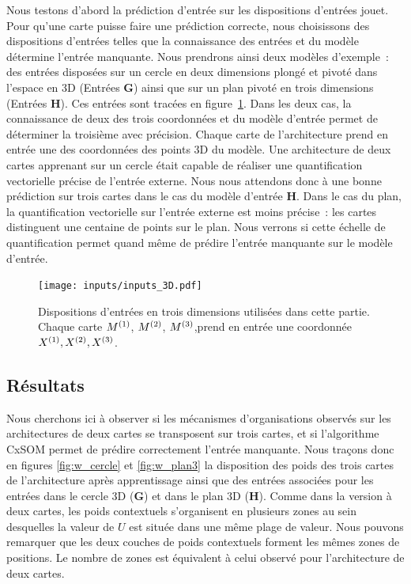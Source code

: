 \documentclass[../main]{subfiles}
\begin{document}
Nous testons d'abord la prédiction d'entrée sur les dispositions d'entrées jouet.
Pour qu'une carte puisse faire une prédiction correcte, nous choisissons des dispositions d'entrées telles que la connaissance des entrées et du modèle détermine l'entrée manquante.
Nous prendrons ainsi deux modèles d'exemple~: des entrées disposées sur un cercle en deux dimensions plongé et pivoté dans l'espace en 3D (Entrées \textbf{G}) ainsi que sur un plan pivoté en trois dimensions (Entrées \textbf{H}). Ces entrées sont tracées en figure~\ref{fig:inputs_3D}. 
Dans les deux cas, la connaissance de deux des trois coordonnées et du modèle d'entrée permet de déterminer la troisième avec précision. Chaque carte de l'architecture prend en entrée une des coordonnées des points 3D du modèle.
Une architecture de deux cartes apprenant sur un cercle était capable de réaliser une quantification vectorielle précise de l'entrée externe. Nous nous attendons donc à une bonne prédiction sur trois cartes dans le cas du modèle d'entrée \textbf{H}. 
Dans le cas du plan, la quantification vectorielle sur l'entrée externe est moins précise~: les cartes distinguent une centaine de points sur le plan. Nous verrons si cette échelle de quantification permet quand même de prédire l'entrée manquante sur le modèle d'entrée.


\begin{figure}[h!]
	\texttt{[image: inputs/inputs\_3D.pdf]}
	\caption{Dispositions d'entrées en trois dimensions utilisées dans cette partie. Chaque carte $M^{({1})}$, $M^{({2})}$, $M^{({3})}$,prend en entrée une coordonnée $X^{({1})}, X^{({2})}, X^{({3})}$. \label{fig:inputs_3D}}
\end{figure}

\subsection{Résultats}

Nous cherchons ici à observer si les mécanismes d'organisations observés sur les architectures de deux cartes se transposent sur trois cartes, et si l'algorithme CxSOM permet de prédire correctement l'entrée manquante.
Nous traçons donc en figures \ref{fig:w_cercle} et \ref{fig:w_plan3} la disposition des poids des trois cartes de l'architecture après apprentissage ainsi que des entrées associées pour les entrées dans le cercle 3D (\textbf{G}) et dans le plan 3D (\textbf{H}).
Comme dans la version à deux cartes, les poids contextuels s'organisent en plusieurs zones au sein desquelles la valeur de $U$ est située dans une même plage de valeur.
Nous pouvons remarquer que les deux couches de poids contextuels forment les mêmes zones de positions.
Le nombre de zones est équivalent à celui observé pour l'architecture de deux cartes.
\end{document}
